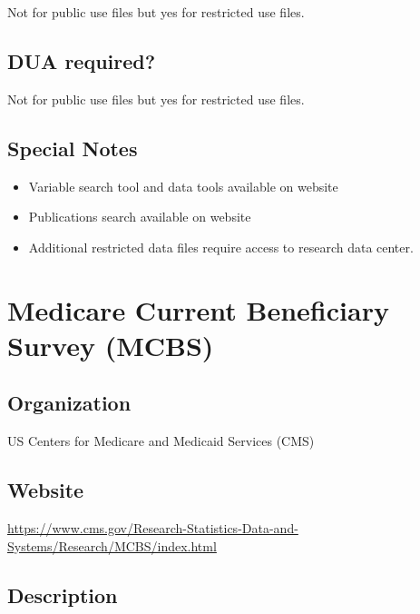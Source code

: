 \documentclass[
]{book}
\providecommand{\tightlist}{%
  \setlength{\itemsep}{0pt}\setlength{\parskip}{0pt}}
\begin{document}
Not for public use files but yes for restricted use files.

\hypertarget{dua-required-37}{%
\section{DUA required?}\label{dua-required-37}}

Not for public use files but yes for restricted use files.

\hypertarget{special-notes-37}{%
\section{Special Notes}\label{special-notes-37}}

\begin{itemize}
\tightlist
\item
  Variable search tool and data tools available on website
\item
  Publications search available on website
\item
  Additional restricted data files require access to research data center.
\end{itemize}

\mainmatter

\hypertarget{medicare-current-beneficiary-survey-mcbs}{%
\chapter{Medicare Current Beneficiary Survey (MCBS)}\label{medicare-current-beneficiary-survey-mcbs}}

\hypertarget{organization-38}{%
\section{Organization}\label{organization-38}}

US Centers for Medicare and Medicaid Services (CMS)

\hypertarget{website-38}{%
\section{Website}\label{website-38}}

\url{https://www.cms.gov/Research-Statistics-Data-and-Systems/Research/MCBS/index.html}

\hypertarget{description-38}{%
\section{Description}\label{description-38}}
\end{document}
